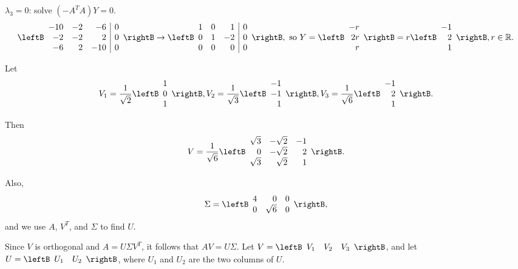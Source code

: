 \begin{solution}
$\lambda_3=0$: solve $(-A^TA)Y= 0$.
\[ \leftB\begin{array}{rrr|r}
-10 & -2 & -6 & 0 \\ -2 & -2 & 2 & 0 \\ -6 & 2 & -10 & 0
\end{array}\rightB
\rightarrow
\leftB\begin{array}{rrr|r}
1 & 0 & 1 & 0 \\ 0 & 1 & -2 & 0 \\ 0 & 0 & 0 & 0
\end{array}\rightB,
\mbox{ so }
Y=\leftB\begin{array}{r} -r \\ 2r \\ r \end{array}\rightB
=r\leftB\begin{array}{r} -1 \\ 2 \\ 1 \end{array}\rightB,
r\in \mathbb{R}. \]

Let
\[ V_1=\frac{1}{\sqrt{2}}\leftB\begin{array}{r} 1\\ 0\\ 1 \end{array}\rightB,
V_2=\frac{1}{\sqrt{3}}\leftB\begin{array}{r} -1\\ -1\\ 1 \end{array}\rightB,
V_3=\frac{1}{\sqrt{6}}\leftB\begin{array}{r} -1\\ 2\\ 1 \end{array}\rightB.\]

Then
\[ V=\frac{1}{\sqrt{6}}\leftB\begin{array}{rrr}
\sqrt 3 & -\sqrt 2 & -1  \\
0 & -\sqrt 2 & 2 \\
\sqrt 3 & \sqrt 2 & 1 \end{array}\rightB.\]

Also,
\[ \Sigma = \leftB\begin{array}{rrr} 4 & 0 & 0 \\
0 & \sqrt 6 & 0 \end{array}\rightB,\]
and we use $A$, $V^T$, and $\Sigma$ to find $U$.

Since $V$ is orthogonal and $A=U\Sigma V^T$, it follows that $AV=U\Sigma$.
Let $V=\leftB\begin{array}{ccc} V_1 & V_2 & V_3 \end{array}\rightB$, and
let $U=\leftB\begin{array}{cc} U_1 & U_2 \end{array}\rightB$, where
$U_1$ and $U_2$ are the two columns of $U$.


\end{solution}
